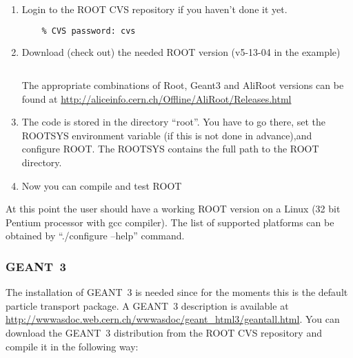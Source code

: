 \documentclass[12pt,a4paper,twoside]{article}
\begin{document}
\begin{enumerate}
\item Login to the ROOT CVS repository if you haven't done it yet.
  \begin{lstlisting}[language=sh]
    % cvs -d :pserver:cvs@root.cern.ch:/user/cvs login
    % CVS password: cvs
  \end{lstlisting}

\item Download (check out) the needed ROOT version (v5-13-04 in the example)
  \begin{lstlisting}[language=sh]
    % cvs -d :pserver:cvs@root.cern.ch:/user/cvs co -r v5-13-04 root
  \end{lstlisting}
  The appropriate  combinations of  Root, Geant3 and  AliRoot versions
  can be found at
  \url{http://aliceinfo.cern.ch/Offline/AliRoot/Releases.html}

\item The code is stored in the directory ``root''. You have to go
  there, set the ROOTSYS environment variable (if this is not done in
  advance),and configure ROOT. The ROOTSYS contains the full path to
  the ROOT directory.

  

\item Now you can compile and test ROOT
  

\end{enumerate}

At this point the user should have a working ROOT version on a Linux
(32 bit Pentium processor with gcc compiler). The list of supported
platforms can be obtained by ``./configure --help'' command.

\subsubsection{GEANT~3}

The installation of GEANT~3 is needed since for the moments this is
the default particle transport package. A GEANT~3 description is
available at 
\url{http://wwwasdoc.web.cern.ch/wwwasdoc/geant_html3/geantall.html}.
You can download the GEANT~3 distribution from the ROOT CVS repository
and compile it in the following way:


\end{document}
